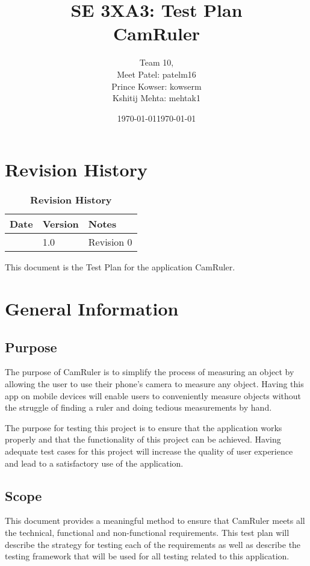 \documentclass[12pt, titlepage]{article}
\title{SE 3XA3: Test Plan\\CamRuler}
\author{Team 10,
		\\ Meet Patel: patelm16
		\\ Prince Kowser: kowserm
		\\ Kshitij Mehta: mehtak1
}
\date{\today}
\begin{document}
\maketitle

\tableofcontents
\listoftables
\listoffigures

\newpage
 \section{Revision History}
\begin{table}[H]
\caption{\bf Revision History}
\begin{tabularx}{\textwidth}{p{4cm}p{2cm}X}
\toprule {\bf Date} & {\bf Version} & {\bf Notes}\\
\midrule
\date{\today} & 1.0 & Revision 0\\
\bottomrule
\end{tabularx}
\end{table}

This document is the Test Plan for the application CamRuler.

\newpage


\section{General Information}

\subsection{Purpose}
The purpose of CamRuler is to simplify the process of measuring an object by allowing the user to use their phone’s camera to measure any object. Having this app on mobile devices will enable users to conveniently measure objects without the struggle of ﬁnding a ruler and doing tedious measurements by hand.

\noindent The purpose for testing this project is to ensure that the application works properly and that the functionality of this project can be achieved. Having adequate test cases for this project will increase the quality of user experience and lead to a satisfactory use of the application.

\subsection{Scope}
This document provides a meaningful method to ensure that CamRuler meets all the technical, functional and non-functional requirements. This test plan will describe the strategy for testing each of the requirements as well as describe the testing framework that will be used for all testing related to this application. 
\end{document}
